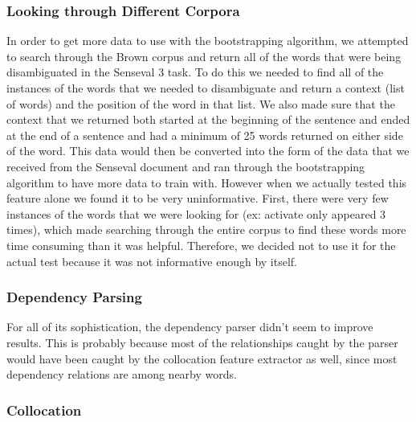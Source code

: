 \documentclass{article}
\begin{document}

\subsubsection{Looking through Different Corpora}

In order to get more data to use with the bootstrapping algorithm, we attempted
to search through the Brown corpus and return all of the words that were being
disambiguated in the Senseval 3 task.  To do this we needed to find all of the
instances of the words that we needed to disambiguate and return a context
(list of words) and the position of the word in that list.  We also made sure
that the context that we returned both started at the beginning of the
sentence and ended at the end of a sentence and had a minimum of 25 words
returned on either side of the word.  This data would then be converted into
the form of the data that we received from the Senseval document and ran
through the bootstrapping algorithm to have more data to train with.  However
when we actually tested this feature alone we found it to be very
uninformative.  First, there were very few instances of the words that we were
looking for (ex: activate only appeared 3 times), which made searching through
the entire corpus to find these words more time consuming than it was helpful.
Therefore, we decided not to use it for the actual test because it was not
informative enough by itself.


\subsubsection{Dependency Parsing}

For all of its sophistication, the dependency parser didn't seem to improve
results.  This is probably because most of the relationships caught by the
parser would have been caught by the collocation feature extractor as well,
since most dependency relations are among nearby words.

\subsubsection{Collocation}
\end{document}
